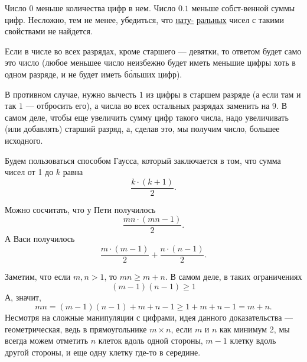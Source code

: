 ﻿
\begin{itemize}
\itA Число $0$ меньше количества цифр в нем. Число $0.1$ меньше собст-\linebreak венной суммы цифр.
Несложно, тем не менее, убедиться, что \underline{нату-} \underline{ральных} чисел с такими свойствами не найдется.

\itB Если в числе во всех разрядах, кроме старшего --- девятки, то ответом будет само это число 
(любое меньшее число неизбежно будет иметь меньшие цифры хоть в одном 
разряде, и не будет иметь б\'ольших цифр).

В противном случае, нужно вычесть $1$ из цифры в старшем разряде (а если там и так
$1$ --- отбросить его), а числа во всех остальных разрядах заменить на $9$. 
В самом деле, чтобы еще увеличить сумму цифр такого числа, надо увеличивать (или добавлять)
старший разряд, а, сделав это, мы получим число, большее исходного.

\itC Будем пользоваться способом Гаусса, который заключается в том,
что сумма чисел от 1 до $k$ равна
$$\frac{k\cdot(k+1)}{2}.$$

Можно сосчитать, что у Пети получилось $$\frac{mn \cdot (mn-1)}{2}.$$
А Васи получилось
$$\frac{m \cdot (m-1)}{2} + \frac{n \cdot (n-1)}{2}.$$

Заметим, что если $m,n > 1$, то $mn \ge m+n$.
В самом деле, в таких ограничениях $$(m-1)(n-1) \ge 1$$ 
А, значит, $$mn = (m-1)(n-1) + m + n - 1 \ge 1 + m + n - 1 = m + n.$$
Несмотря на сложные манипуляции с цифрами, идея данного доказательства --- геометрическая,
ведь в прямоугольнике $m \times n$, если $m$ и $n$ как минимум 2, мы всегда 
можем отметить $n$ клеток вдоль одной стороны,
$m-1$ клетку вдоль другой стороны, и еще одну клетку где-то в середине.
\begin{center}%
\end{center}



\end{itemize}
